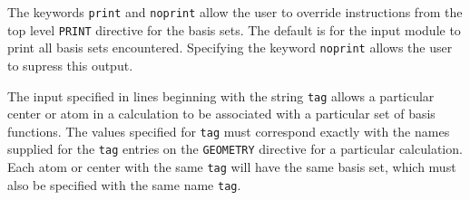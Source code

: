 The keywords \verb+print+ and \verb+noprint+ allow the user to override
instructions from the top level \verb+PRINT+ directive for the basis sets.
The default is for the input module to print all basis sets encountered.
Specifying the keyword \verb+noprint+ allows the user to supress this output.

%
% 

The input specified in lines beginning with the string \verb+tag+
allows a particular center or atom in a calculation to be associated with
a particular set of basis functions.  The values specified for \verb+tag+
must correspond exactly with the names supplied for the \verb+tag+ entries
on the \verb+GEOMETRY+ directive for a particular calculation.  Each atom
or center with the same \verb+tag+ will have the same basis set, which must
also be specified with the same name \verb+tag+.

